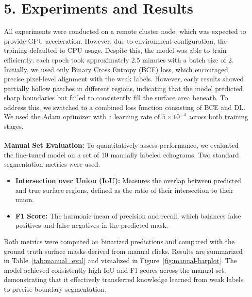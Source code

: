 \documentclass[11pt,oneside,openany]{article}
\begin{document}
\section*{5. Experiments and Results}
All experiments were conducted on a remote cluster node, which was expected to provide GPU acceleration. However, due to environment configuration, the training defaulted to CPU usage. Despite this, the model was able to train efficiently: each epoch took approximately 2.5 minutes with a batch size of 2. Initially, we used only Binary Cross Entropy (BCE) loss, which encouraged precise pixel-level alignment with the weak labels. However, early results showed partially hollow patches in different regions, indicating that the model predicted sharp boundaries but failed to consistently fill the surface area beneath. To address this, we switched to a combined loss function consisting of BCE and DL. We used the Adam optimizer with a learning rate of $5 \times 10^{-4}$ across both training stages.\\\\
\textbf{Manual Set Evaluation:} 
To quantitatively assess performance, we evaluated the fine-tuned model on a set of 10 manually labeled echograms. Two standard segmentation metrics were used:
\begin{itemize}[noitemsep]
    \item \textbf{Intersection over Union (IoU):} Measures the overlap between predicted and true surface regions, defined as the ratio of their intersection to their union.
    \item \textbf{F1 Score:} The harmonic mean of precision and recall, which balances false positives and false negatives in the predicted mask.
\end{itemize}Both metrics were computed on binarized predictions and compared with the ground truth surface masks derived from manual clicks. Results are summarized in Table~\ref{tab:manual_eval} and visualized in Figure~\ref{fig:manual-barplot}. The model achieved consistently high IoU and F1 scores across the manual set, demonstrating that it effectively transferred knowledge learned from weak labels to precise boundary segmentation.
\end{document}
